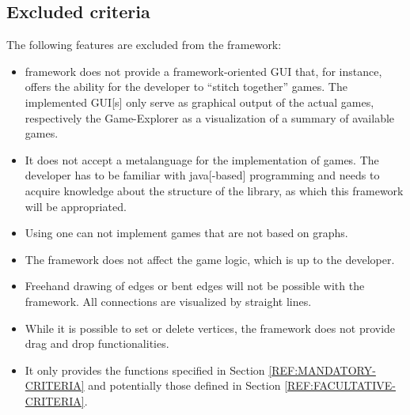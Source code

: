 \subsection{Excluded criteria}
The following features are excluded from the framework:

\begin{itemize}
	\item {\graphioli} framework does not provide a framework-oriented \gls{GUI} that, for instance, offers the ability for the developer to ``stitch together'' games. The implemented \gls{GUI}[s] only serve as graphical output of the actual games, respectively the Game-Explorer as a visualization of a summary of available games.
	\item It does not accept a \gls{metalanguage} for the implementation of games. The \gls{developer} has to be familiar with \Gls{java}[-based] programming and needs to acquire knowledge about the structure of the \gls{library}, as which this framework will be appropriated.
	\item Using {\graphioli} one can not implement \glspl{game} that are not based on \glspl{graph}.
	\item The framework does not affect the game logic, which is up to the developer.
	\item Freehand drawing of \glspl{edge} or bent edges will not be possible with the {\graphioli} framework. All connections are visualized by straight lines.
	\item While it is possible to set or delete vertices, the framework does not provide drag and drop functionalities.
	\item It only provides the functions specified in Section \ref{REF:MANDATORY-CRITERIA} and potentially those defined in Section \ref{REF:FACULTATIVE-CRITERIA}.
\end{itemize}